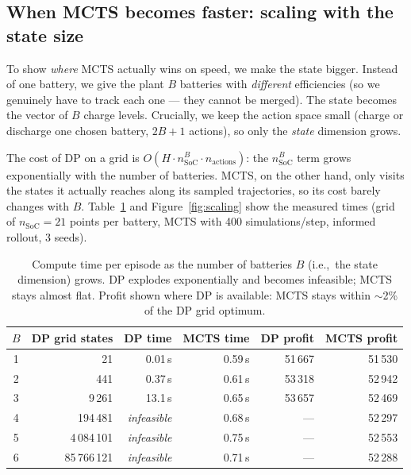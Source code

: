 \documentclass[12pt,a4paper]{article}
\newcommand{\soc}{\mathrm{SoC}}
\newcommand{\ie}{i.e.,\ }
\begin{document}
\subsection{When MCTS becomes faster: scaling with the state size}

To show \emph{where} MCTS actually wins on speed, we make the state bigger.
Instead of one battery, we give the plant $B$ batteries with \emph{different}
efficiencies (so we genuinely have to track each one — they cannot be merged).
The state becomes the vector of $B$ charge levels. Crucially, we keep the
action space small (charge or discharge one chosen battery, $2B+1$ actions),
so only the \emph{state} dimension grows.

The cost of DP on a grid is $O(H \cdot n_{\soc}^{B} \cdot n_{\text{actions}})$:
the $n_{\soc}^{B}$ term grows exponentially with the number of batteries. MCTS,
on the other hand, only visits the states it actually reaches along its sampled
trajectories, so its cost barely changes with $B$. Table~\ref{tab:scaling} and
Figure~\ref{fig:scaling} show the measured times (grid of $n_{\soc}=21$ points
per battery, MCTS with 400 simulations/step, informed rollout, 3 seeds).

\begin{table}[H]
  \centering
  \caption{Compute time per episode as the number of batteries $B$ (\ie the
           state dimension) grows. DP explodes exponentially and becomes
           infeasible; MCTS stays almost flat. Profit shown where DP is
           available: MCTS stays within $\sim$2\% of the DP grid optimum.}
  \label{tab:scaling}
  \begin{tabular}{crrrrr}
    \toprule
    $B$ & DP grid states & DP time & MCTS time & DP profit & MCTS profit \\
    \midrule
    1 & 21          & 0.01\,s & 0.59\,s & 51\,667 & 51\,530 \\
    2 & 441         & 0.37\,s & 0.61\,s & 53\,318 & 52\,942 \\
    3 & 9\,261      & 13.1\,s & 0.65\,s & 53\,657 & 52\,469 \\
    4 & 194\,481    & \emph{infeasible} & 0.68\,s & --- & 52\,297 \\
    5 & 4\,084\,101 & \emph{infeasible} & 0.75\,s & --- & 52\,553 \\
    6 & 85\,766\,121 & \emph{infeasible} & 0.71\,s & --- & 52\,288 \\
    \bottomrule
  \end{tabular}
\end{table}
\end{document}
